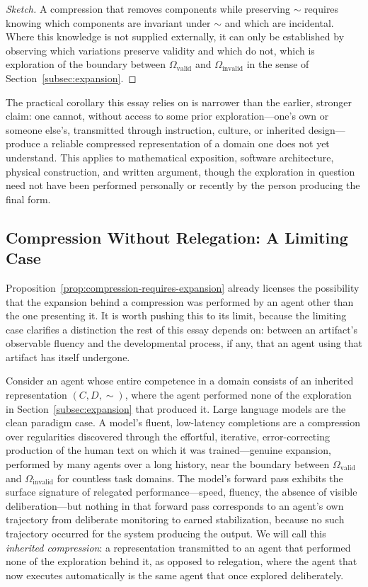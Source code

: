 \documentclass[12pt, a4paper]{article}
\theoremstyle{plain}
\theoremstyle{definition}
\theoremstyle{remark}
\begin{document}
\begin{proof}[Sketch]
A compression that removes components while preserving $\sim$ requires knowing which components are invariant under $\sim$ and which are incidental. Where this knowledge is not supplied externally, it can only be established by observing which variations preserve validity and which do not, which is exploration of the boundary between $\Omega_{\mathrm{valid}}$ and $\Omega_{\mathrm{invalid}}$ in the sense of Section~\ref{subsec:expansion}.
\end{proof}

The practical corollary this essay relies on is narrower than the earlier, stronger claim: one cannot, without access to some prior exploration---one's own or someone else's, transmitted through instruction, culture, or inherited design---produce a reliable compressed representation of a domain one does not yet understand. This applies to mathematical exposition, software architecture, physical construction, and written argument, though the exploration in question need not have been performed personally or recently by the person producing the final form.

\subsection{Compression Without Relegation: A Limiting Case}
\label{subsec:compression-without-relegation}

Proposition~\ref{prop:compression-requires-expansion} already licenses the possibility that the expansion behind a compression was performed by an agent other than the one presenting it. It is worth pushing this to its limit, because the limiting case clarifies a distinction the rest of this essay depends on: between an artifact's observable fluency and the developmental process, if any, that an agent using that artifact has itself undergone.

Consider an agent whose entire competence in a domain consists of an inherited representation $(C, D, \sim)$, where the agent performed none of the exploration in Section~\ref{subsec:expansion} that produced it. Large language models are the clean paradigm case. A model's fluent, low-latency completions are a compression over regularities discovered through the effortful, iterative, error-correcting production of the human text on which it was trained---genuine expansion, performed by many agents over a long history, near the boundary between $\Omega_{\mathrm{valid}}$ and $\Omega_{\mathrm{invalid}}$ for countless task domains. The model's forward pass exhibits the surface signature of relegated performance---speed, fluency, the absence of visible deliberation---but nothing in that forward pass corresponds to an agent's own trajectory from deliberate monitoring to earned stabilization, because no such trajectory occurred for the system producing the output. We will call this \emph{inherited compression}: a representation transmitted to an agent that performed none of the exploration behind it, as opposed to relegation, where the agent that now executes automatically is the same agent that once explored deliberately.
\end{document}
